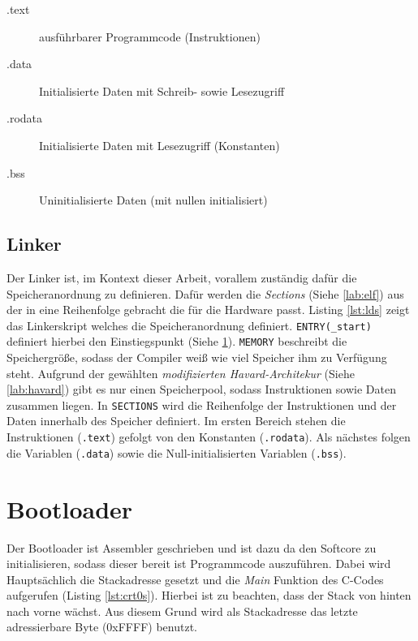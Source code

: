         \begin{description}
            \item[.text] ausführbarer Programmcode (Instruktionen)
            \item[.data] Initialisierte Daten mit Schreib- sowie Lesezugriff
            \item[.rodata] Initialisierte Daten mit Lesezugriff (Konstanten)
            \item[.bss] Uninitialisierte Daten (mit nullen initialisiert)
        \end{description}
    
    \subsection{Linker}
        Der Linker ist, im Kontext dieser Arbeit, vorallem zuständig dafür
        die Speicheranordnung zu definieren. Dafür werden die \textit{Sections} (Siehe \ref{lab:elf})
        aus der in eine Reihenfolge gebracht die für die Hardware passt.
        Listing \ref{lst:lds} zeigt das Linkerskript welches die Speicheranordnung definiert.
        \texttt{ENTRY(\_start)} definiert hierbei den Einstiegspunkt (Siehe \ref{lab:bootloader}).
        \texttt{MEMORY} beschreibt die Speichergröße, sodass der Compiler weiß wie
        viel Speicher ihm zu Verfügung steht. Aufgrund der gewählten \textit{modifizierten Havard-Architekur} (Siehe \ref{lab:havard})
        gibt es nur einen Speicherpool, sodass Instruktionen sowie Daten zusammen liegen.
        In \texttt{SECTIONS} wird die Reihenfolge der Instruktionen und der Daten innerhalb des Speicher
        definiert. Im ersten Bereich stehen die Instruktionen (\texttt{.text}) gefolgt von den Konstanten (\texttt{.rodata}).
        Als nächstes folgen die Variablen (\texttt{.data}) sowie die Null-initialisierten Variablen (\texttt{.bss}).
        
        

    \section{Bootloader}\label{lab:bootloader}

        Der Bootloader ist Assembler geschrieben und ist dazu da den
        Softcore zu initialisieren, sodass dieser bereit ist Programmcode auszuführen.
        Dabei wird Hauptsächlich die Stackadresse gesetzt und die \textit{Main}
        Funktion des C-Codes aufgerufen  (Listing \ref{lst:crt0s}).
        Hierbei ist zu beachten, dass der Stack von hinten nach vorne wächst.
        Aus diesem Grund wird als Stackadresse das letzte adressierbare Byte (0xFFFF) benutzt.
        

